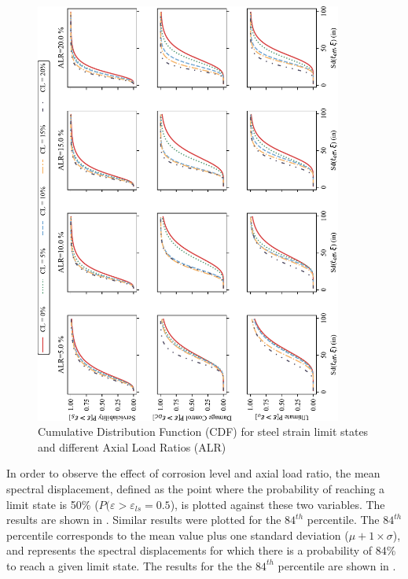 \begin{figure}[htbp]
	\centering
	\includegraphics[width=0.9\textwidth]{VAC Thesis 2.0/Chapter-5/figs/CDF_summary.pdf}
	\caption{Cumulative Distribution Function (CDF) for steel strain limit states and different Axial Load Ratios (ALR)}
	\label{fig:CDF_strain_vs_ALR}
\end{figure}

In order to observe the effect of corrosion level and axial load ratio, the mean spectral displacement, defined as the point where the probability of reaching a limit state is 50\% ($P(\varepsilon>\varepsilon_{ls}=0.5$), is plotted against these two variables. The results are shown in . Similar results were plotted for the $84^{th}$ percentile. The $84^{th}$ percentile corresponds to the mean value plus one standard deviation ($\mu+1\times\sigma$), and represents the spectral displacements for which there is a probability of 84\% to reach a given limit state. The results for the the $84^{th}$ percentile are shown in .

